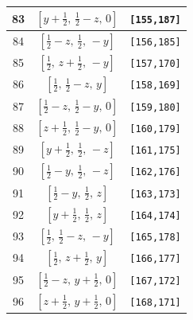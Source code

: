 \documentclass[fleqn,8pt]{jsarticle}
\begin{document}
\begin{longtable}{ccc}
83 & $\left[ y + \frac{1}{2},\, \frac{1}{2} - z,\, 0 \right]$ & {\tt [155,187]} \\ \hline
84 & $\left[ \frac{1}{2} - z,\, \frac{1}{2},\, - y \right]$ & {\tt [156,185]} \\ \hline
85 & $\left[ \frac{1}{2},\, z + \frac{1}{2},\, - y \right]$ & {\tt [157,170]} \\ \hline
86 & $\left[ \frac{1}{2},\, \frac{1}{2} - z,\, y \right]$ & {\tt [158,169]} \\ \hline
87 & $\left[ \frac{1}{2} - z,\, \frac{1}{2} - y,\, 0 \right]$ & {\tt [159,180]} \\ \hline
88 & $\left[ z + \frac{1}{2},\, \frac{1}{2} - y,\, 0 \right]$ & {\tt [160,179]} \\ \hline
89 & $\left[ y + \frac{1}{2},\, \frac{1}{2},\, - z \right]$ & {\tt [161,175]} \\ \hline
90 & $\left[ \frac{1}{2} - y,\, \frac{1}{2},\, - z \right]$ & {\tt [162,176]} \\ \hline
91 & $\left[ \frac{1}{2} - y,\, \frac{1}{2},\, z \right]$ & {\tt [163,173]} \\ \hline
92 & $\left[ y + \frac{1}{2},\, \frac{1}{2},\, z \right]$ & {\tt [164,174]} \\ \hline
93 & $\left[ \frac{1}{2},\, \frac{1}{2} - z,\, - y \right]$ & {\tt [165,178]} \\ \hline
94 & $\left[ \frac{1}{2},\, z + \frac{1}{2},\, y \right]$ & {\tt [166,177]} \\ \hline
95 & $\left[ \frac{1}{2} - z,\, y + \frac{1}{2},\, 0 \right]$ & {\tt [167,172]} \\ \hline
96 & $\left[ z + \frac{1}{2},\, y + \frac{1}{2},\, 0 \right]$ & {\tt [168,171]} \\
\end{longtable}
\renewcommand{\arraystretch}{1.2}
\end{document}
